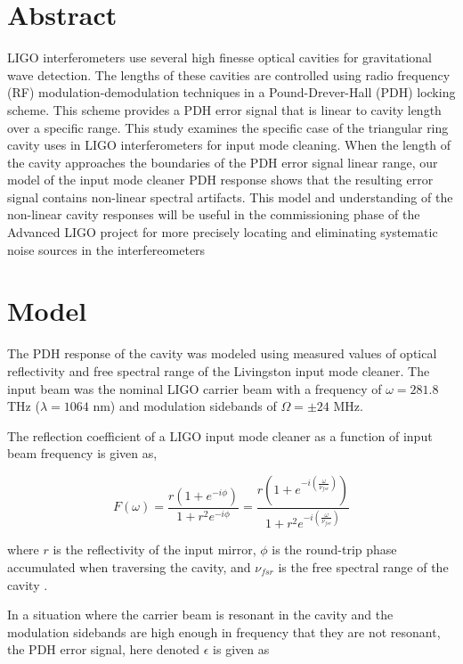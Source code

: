 \section{Abstract}

LIGO interferometers use several high finesse optical cavities for gravitational wave detection. The lengths of these cavities are controlled using radio frequency (RF) modulation-demodulation techniques in a Pound-Drever-Hall (PDH) locking scheme. This scheme provides a PDH error signal that is linear to cavity length over a specific range. This study examines the specific case of the triangular ring cavity uses in LIGO interferometers for input mode cleaning. When the length of the cavity approaches the boundaries of the PDH error signal linear range, our model of the input mode cleaner PDH response shows that the resulting error signal contains non-linear spectral artifacts. This model and understanding of the non-linear cavity responses will be useful in the commissioning phase of the Advanced LIGO project for more precisely locating and eliminating systematic noise sources in the interfereometers

\section{Model}

The PDH response of the cavity was modeled using measured values of optical reflectivity and free spectral range of the Livingston input mode cleaner. The input beam was the nominal LIGO carrier beam with a frequency of $\omega = 281.8$ THz ($\lambda = 1064$ nm) and modulation sidebands of $\Omega = \pm24$ MHz.

The reflection coefficient of a LIGO input mode cleaner as a function of input beam frequency is given as,

\begin{equation}
F(\omega) = \frac{r(1 + e^{-i\phi})}{1+r^2e^{-i\phi}} = \frac{r(1 + e^{-i(\frac{\omega}{\nu_{fsr}})})}{1+r^2e^{-i(\frac{\omega}{\nu_{fsr}})}}
\end{equation}

where $r$ is the reflectivity of the input mirror, $\phi$ is the round-trip phase accumulated when traversing the cavity, and $\nu_{fsr}$ is the free spectral range of the cavity \cite{Mueller}.

In a situation where the carrier beam is resonant in the cavity and the modulation sidebands are high enough in frequency that they are not resonant, the PDH error signal, here denoted $\epsilon$ is given as

